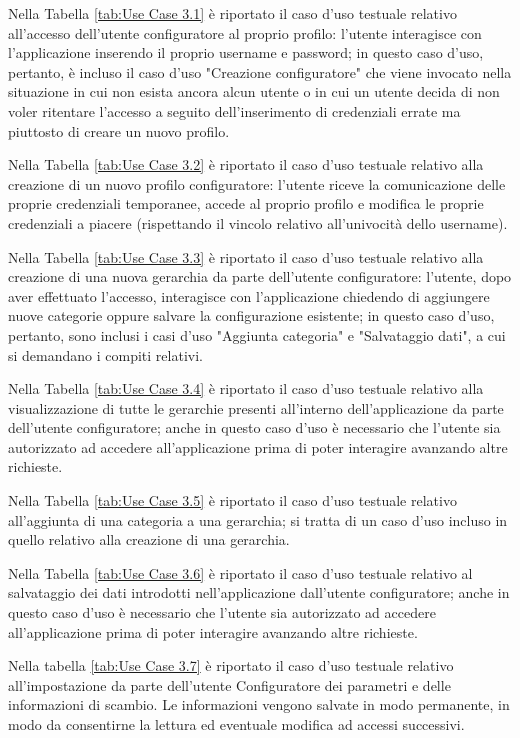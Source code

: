 Nella Tabella \ref{tab:Use Case 3.1} è riportato il caso d'uso testuale relativo all'accesso dell'utente configuratore al proprio profilo: l'utente interagisce con l'applicazione inserendo il proprio username e password; in questo caso d'uso, pertanto, è incluso il caso d'uso "Creazione configuratore" che viene invocato nella situazione in cui non esista ancora alcun utente o in cui un utente decida di non voler ritentare l'accesso a seguito dell'inserimento di credenziali errate ma piuttosto di creare un nuovo profilo.\bigskip

Nella Tabella \ref{tab:Use Case 3.2} è riportato il caso d'uso testuale relativo alla creazione di un nuovo profilo configuratore: l'utente riceve la comunicazione delle proprie credenziali temporanee, accede al proprio profilo e modifica le proprie credenziali a piacere (rispettando il vincolo relativo all'univocità dello username).\bigskip

Nella Tabella \ref{tab:Use Case 3.3} è riportato il caso d'uso testuale relativo alla creazione di una nuova gerarchia da parte dell'utente configuratore: l'utente, dopo aver effettuato l'accesso, interagisce con l'applicazione chiedendo di aggiungere nuove categorie oppure salvare la configurazione esistente; in questo caso d'uso, pertanto, sono inclusi i casi d'uso "Aggiunta categoria" e "Salvataggio dati", a cui si demandano i compiti relativi.\bigskip

Nella Tabella \ref{tab:Use Case 3.4} è riportato il caso d'uso testuale relativo alla visualizzazione di tutte le gerarchie presenti all'interno dell'applicazione da parte dell'utente configuratore; anche in questo caso d'uso è necessario che l'utente sia autorizzato ad accedere all'applicazione prima di poter interagire avanzando altre richieste.\bigskip

Nella Tabella \ref{tab:Use Case 3.5} è riportato il caso d'uso testuale relativo all'aggiunta di una categoria a una gerarchia; si tratta di un caso d'uso incluso in quello relativo alla creazione di una gerarchia.\bigskip

Nella Tabella \ref{tab:Use Case 3.6} è riportato il caso d'uso testuale relativo al salvataggio dei dati introdotti nell'applicazione dall'utente configuratore; anche in questo caso d'uso è necessario che l'utente sia autorizzato ad accedere all'applicazione prima di poter interagire avanzando altre richieste.\bigskip

Nella tabella \ref{tab:Use Case 3.7} è riportato il caso d'uso testuale relativo all'impostazione da parte dell'utente Configuratore dei parametri e delle informazioni di scambio. Le informazioni vengono salvate in modo permanente, in modo da consentirne la lettura ed eventuale modifica ad accessi successivi.\bigskip

